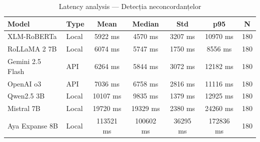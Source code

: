 \begin{table}[H]
\centering
\footnotesize
\caption{Latency analysis — Detecția neconcordanțelor}
\label{tab:latency-incongruity-detection}
\begin{tabular}{llccccc}
\toprule
\textbf{Model} & \textbf{Type} & \textbf{Mean} & \textbf{Median} & \textbf{Std} & \textbf{p95} & \textbf{N} \\
\midrule
XLM-RoBERTa & Local & 5922 ms & 4570 ms & 3207 ms & 10970 ms & 180 \\
RoLLaMA 2 7B & Local & 6074 ms & 5747 ms & 1750 ms & 8556 ms & 180 \\
Gemini 2.5 Flash & API & 6264 ms & 5844 ms & 3072 ms & 12182 ms & 180 \\
OpenAI o3 & API & 7036 ms & 6758 ms & 2816 ms & 11116 ms & 180 \\
Qwen2.5 3B & Local & 10107 ms & 9835 ms & 1379 ms & 12925 ms & 180 \\
Mistral 7B & Local & 19720 ms & 19329 ms & 2380 ms & 24260 ms & 180 \\
Aya Expanse 8B & Local & 113521 ms & 100602 ms & 36295 ms & 172836 ms & 180 \\
\bottomrule
\end{tabular}
\end{table}